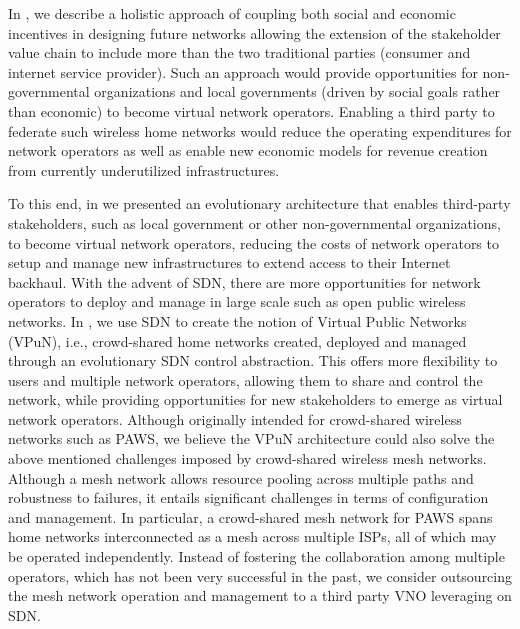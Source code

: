 In \cite{LCDNet}, we describe a holistic approach of coupling both social and economic incentives in designing future networks allowing the extension of the stakeholder value chain to include more than the two traditional parties (consumer and internet service provider). Such an approach would provide opportunities for non-governmental organizations and local governments (driven by social goals rather than economic) to become virtual network operators. Enabling a third party to federate such wireless home networks would reduce the operating expenditures for network operators as well as enable new economic models for revenue creation from currently underutilized infrastructures.

To this end, in \cite{EWSDN} we presented an evolutionary architecture that enables third-party stakeholders, such as local government or other non-governmental organizations, to become virtual network operators, reducing the costs of network operators to setup and manage new infrastructures to extend access to their Internet backhaul. With the advent of SDN, there are more opportunities for network operators to deploy and manage in large scale such as open public wireless networks. In \cite{EWSDN}, we use SDN to create the notion of Virtual Public Networks (VPuN), i.e., crowd-shared home networks created, deployed and managed through an evolutionary SDN control abstraction. This offers more flexibility to users and multiple network operators, allowing them to share and control the network, while providing opportunities for new stakeholders to emerge as virtual network operators. Although originally intended for crowd-shared wireless networks such as PAWS, we believe the VPuN architecture could also solve the above mentioned challenges imposed by crowd-shared wireless mesh networks. Although a mesh network allows resource pooling across multiple paths and robustness to failures, it entails significant challenges in terms of configuration and management. In particular, a crowd-shared mesh network for PAWS spans home networks interconnected as a mesh across multiple ISPs, all of which may be operated independently. Instead of fostering the collaboration among multiple operators, which has not been very successful in the past, we consider outsourcing the mesh network operation and management to a third party VNO leveraging on SDN.

